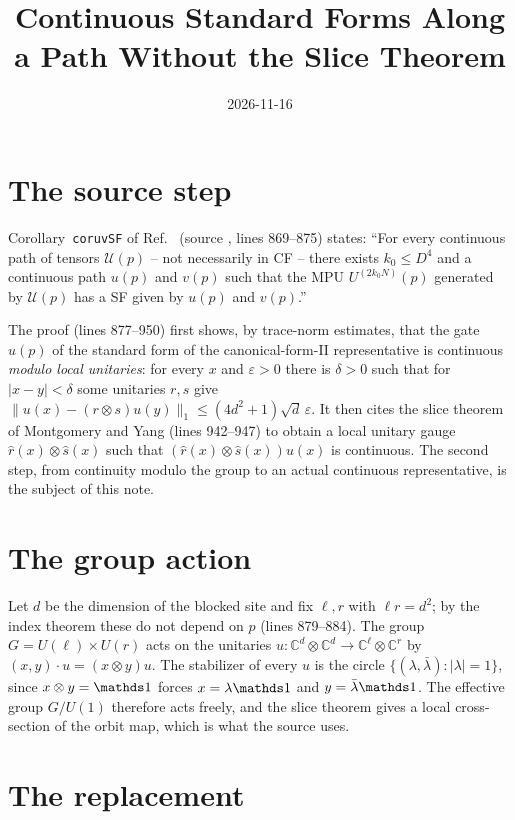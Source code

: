 \documentclass{article}
\title{Continuous Standard Forms Along a Path Without the Slice Theorem}
\author{}
\date{2026-11-16}
\begin{document}
\maketitle
{}

\section{The source step}

Corollary~\texttt{coruvSF} of Ref.~\cite{Cirac2017MPU} (source
, lines 869--875) states: ``For every
continuous path of tensors $\mathcal U(p)$ -- not necessarily in CF -- there
exists $k_0\le D^4$ and a continuous path $u(p)$ and $v(p)$ such that the MPU
$U^{(2k_0N)}(p)$ generated by $\mathcal U(p)$ has a SF given by $u(p)$ and
$v(p)$.''

The proof (lines 877--950) first shows, by trace-norm estimates, that the
gate $u(p)$ of the standard form of the canonical-form-II representative is
continuous \emph{modulo local unitaries}: for every $x$ and $\varepsilon>0$
there is $\delta>0$ such that for $|x-y|<\delta$ some unitaries $r,s$ give
$\|u(x)-(r\otimes s)u(y)\|_1\le(4d^2+1)\sqrt d\,\varepsilon$. It then cites the
slice theorem of Montgomery and Yang (lines 942--947) to obtain a local unitary
gauge $\hat r(x)\otimes\hat s(x)$ such that $(\hat r(x)\otimes\hat s(x))u(x)$
is continuous. The second step, from continuity modulo the group to an actual
continuous representative, is the subject of this note.

\section{The group action}

Let $d$ be the dimension of the blocked site and fix $\ell,r$ with
$\ell r=d^2$; by the index theorem these do not depend on $p$ (lines
879--884). The group $G=U(\ell)\times U(r)$ acts on the unitaries
$u:\mathbb C^d\otimes\mathbb C^d\to\mathbb C^\ell\otimes\mathbb C^r$ by
$(x,y)\cdot u=(x\otimes y)u$. The stabilizer of every $u$ is the circle
$\{(\lambda,\bar\lambda):|\lambda|=1\}$, since $x\otimes y=\Id$ forces
$x=\lambda\Id$ and $y=\bar\lambda\Id$. The effective group $G/U(1)$ therefore
acts freely, and the slice theorem gives a local cross-section of the orbit
map, which is what the source uses.

\section{The replacement}
\end{document}
